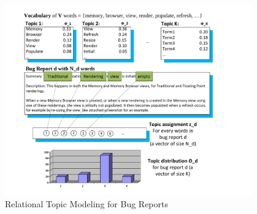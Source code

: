 %





\begin{figure}[t]
\centering
\includegraphics[width=4.2in]{irtm4}
\vspace{-21pt}
\caption{Relational Topic Modeling for Bug Reports}
\vspace{-6pt}
\label{topicmodel}
\end{figure}



